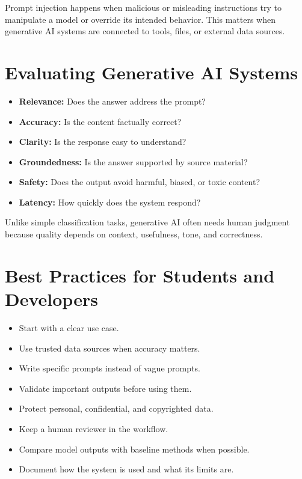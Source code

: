 \documentclass[11pt,a4paper]{article}
\begin{document}
\begin{conceptbox}
Prompt injection happens when malicious or misleading instructions try to manipulate a model or override its intended behavior. This matters when generative AI systems are connected to tools, files, or external data sources.
\end{conceptbox}

\section{Evaluating Generative AI Systems}

\begin{itemize}[leftmargin=*]
  \item \textbf{Relevance:} Does the answer address the prompt?
  \item \textbf{Accuracy:} Is the content factually correct?
  \item \textbf{Clarity:} Is the response easy to understand?
  \item \textbf{Groundedness:} Is the answer supported by source material?
  \item \textbf{Safety:} Does the output avoid harmful, biased, or toxic content?
  \item \textbf{Latency:} How quickly does the system respond?
\end{itemize}

\begin{conceptbox}
Unlike simple classification tasks, generative AI often needs human judgment because quality depends on context, usefulness, tone, and correctness.
\end{conceptbox}

\section{Best Practices for Students and Developers}

\begin{itemize}[leftmargin=*]
  \item Start with a clear use case.
  \item Use trusted data sources when accuracy matters.
  \item Write specific prompts instead of vague prompts.
  \item Validate important outputs before using them.
  \item Protect personal, confidential, and copyrighted data.
  \item Keep a human reviewer in the workflow.
  \item Compare model outputs with baseline methods when possible.
  \item Document how the system is used and what its limits are.
\end{itemize}
\end{document}
